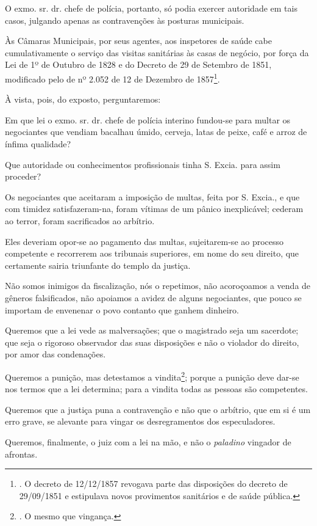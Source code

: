 O exmo. sr. dr. chefe de polícia, portanto, só podia exercer autoridade
em tais casos, julgando apenas as contravenções às posturas municipais.

Às Câmaras Municipais, por seus agentes, aos inspetores de saúde cabe
cumulativamente o serviço das visitas sanitárias às casas de negócio,
por força da Lei de 1º de Outubro de 1828 e do Decreto de 29 de Setembro
de 1851, modificado pelo de nº 2.052 de 12 de Dezembro de
1857\footnote{. O decreto de 12/12/1857 revogava parte das disposições
  do decreto de 29/09/1851 e estipulava novos provimentos sanitários e
  de saúde pública.}.

À vista, pois, do exposto, perguntaremos:

Em que lei o exmo. sr. dr. chefe de polícia interino fundou-se para
multar os negociantes que vendiam bacalhau úmido, cerveja, latas de
peixe, café e arroz de ínfima qualidade?

Que autoridade ou conhecimentos profissionais tinha S. Excia. para assim
proceder?

Os negociantes que aceitaram a imposição de multas, feita por S. Excia.,
e que com timidez satisfazeram-na, foram vítimas de um pânico
inexplicável; cederam ao terror, foram sacrificados ao arbítrio.

Eles deveriam opor-se ao pagamento das multas, sujeitarem-se ao processo
competente e recorrerem aos tribunais superiores, em nome do seu
direito, que certamente sairia triunfante do templo da justiça.

Não somos inimigos da fiscalização, nós o repetimos, não acoroçoamos a
venda de gêneros falsificados, não apoiamos a avidez de alguns
negociantes, que pouco se importam de envenenar o povo contanto que
ganhem dinheiro.

Queremos que a lei vede as malversações; que o magistrado seja um
sacerdote; que seja o rigoroso observador das suas disposições e não o
violador do direito, por amor das condenações.

Queremos a punição, mas detestamos a vindita\footnote{. O mesmo que
  vingança.}; porque a punição deve dar-se nos termos que a lei
determina; para a vindita todas as pessoas são competentes.

Queremos que a justiça puna a contravenção e não que o arbítrio, que em
si é um erro grave, se alevante para vingar os desregramentos dos
especuladores.

Queremos, finalmente, o juiz com a lei na mão, e não o \emph{paladino}
vingador de afrontas.

